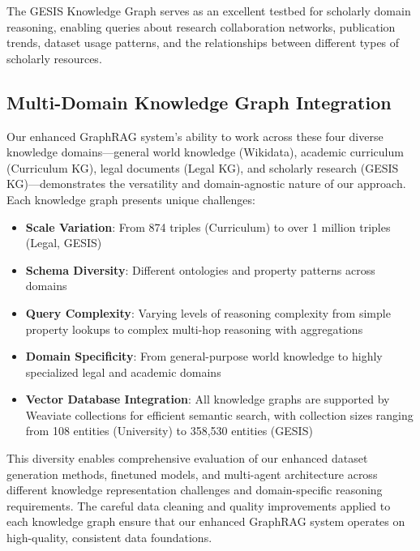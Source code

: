 The GESIS Knowledge Graph serves as an excellent testbed for scholarly domain reasoning, enabling queries about research collaboration networks, publication trends, dataset usage patterns, and the relationships between different types of scholarly resources.

\vspace{0.5cm}
\subsection{Multi-Domain Knowledge Graph Integration}

Our enhanced GraphRAG system's ability to work across these four diverse knowledge domains—general world knowledge (Wikidata), academic curriculum (Curriculum KG), legal documents (Legal KG), and scholarly research (GESIS KG)—demonstrates the versatility and domain-agnostic nature of our approach. Each knowledge graph presents unique challenges:

\begin{itemize}
    \item \textbf{Scale Variation}: From 874 triples (Curriculum) to over 1 million triples (Legal, GESIS)
    \item \textbf{Schema Diversity}: Different ontologies and property patterns across domains
    \item \textbf{Query Complexity}: Varying levels of reasoning complexity from simple property lookups to complex multi-hop reasoning with aggregations
    \item \textbf{Domain Specificity}: From general-purpose world knowledge to highly specialized legal and academic domains
    \item \textbf{Vector Database Integration}: All knowledge graphs are supported by Weaviate collections for efficient semantic search, with collection sizes ranging from 108 entities (University) to 358,530 entities (GESIS)
\end{itemize}

This diversity enables comprehensive evaluation of our enhanced dataset generation methods, finetuned models, and multi-agent architecture across different knowledge representation challenges and domain-specific reasoning requirements. The careful data cleaning and quality improvements applied to each knowledge graph ensure that our enhanced GraphRAG system operates on high-quality, consistent data foundations.

